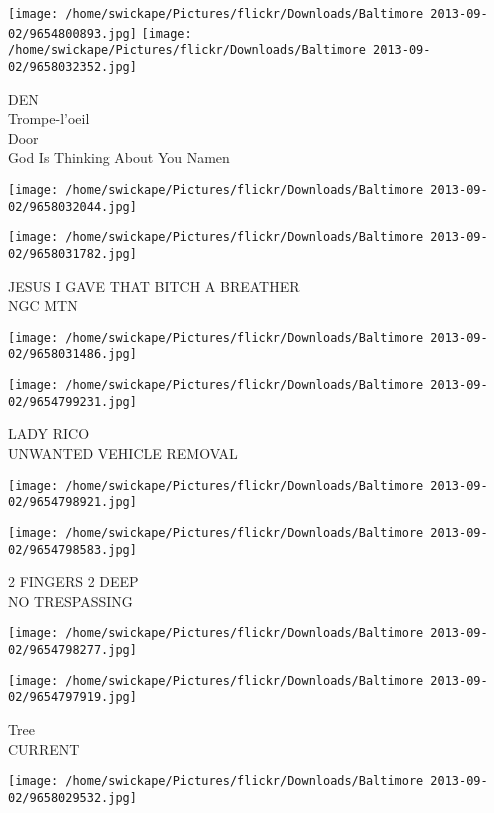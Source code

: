 \documentclass[10pt,letterpaper]{article}
\begin{document}
\texttt{[image: /home/swickape/Pictures/flickr/Downloads/Baltimore 2013-09-02/9654800893.jpg]}
\texttt{[image: /home/swickape/Pictures/flickr/Downloads/Baltimore 2013-09-02/9658032352.jpg]}

DEN\\
Trompe{-}l'oeil\\
Door\\
God Is Thinking About You Namen
\pagebreak

\texttt{[image: /home/swickape/Pictures/flickr/Downloads/Baltimore 2013-09-02/9658032044.jpg]}

\vspace{0.25in}
\texttt{[image: /home/swickape/Pictures/flickr/Downloads/Baltimore 2013-09-02/9658031782.jpg]}

JESUS I GAVE THAT BITCH A BREATHER\\
NGC MTN
\pagebreak

\texttt{[image: /home/swickape/Pictures/flickr/Downloads/Baltimore 2013-09-02/9658031486.jpg]}

\vspace{0.25in}
\texttt{[image: /home/swickape/Pictures/flickr/Downloads/Baltimore 2013-09-02/9654799231.jpg]}

LADY RICO\\
UNWANTED VEHICLE REMOVAL
\pagebreak

\texttt{[image: /home/swickape/Pictures/flickr/Downloads/Baltimore 2013-09-02/9654798921.jpg]}

\vspace{0.25in}
\texttt{[image: /home/swickape/Pictures/flickr/Downloads/Baltimore 2013-09-02/9654798583.jpg]}

2 FINGERS 2 DEEP\\
NO TRESPASSING
\pagebreak

\texttt{[image: /home/swickape/Pictures/flickr/Downloads/Baltimore 2013-09-02/9654798277.jpg]}

\vspace{0.25in}
\texttt{[image: /home/swickape/Pictures/flickr/Downloads/Baltimore 2013-09-02/9654797919.jpg]}

Tree\\
CURRENT
\pagebreak

\texttt{[image: /home/swickape/Pictures/flickr/Downloads/Baltimore 2013-09-02/9658029532.jpg]}
\end{document}
